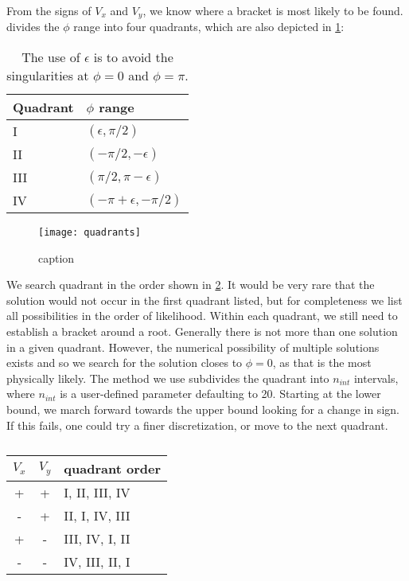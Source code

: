 From the signs of $V_x$ and $V_y$, we know where a bracket is most likely to be found.   divides the $\phi$ range into four quadrants, which are also depicted in \cref{fig:quadrants}:
\begin{table}[htb]
\centering
\caption{The use of $\epsilon$ is to avoid the singularities at $\phi = 0$ and $\phi = \pi$.}
\label{tab:quadrants}
\begin{tabular}{@{}ll@{}}
\toprule
Quadrant & $\phi$ range\\
\midrule
I & $(\epsilon, \pi/2)$ \\
II & $(-\pi/2, -\epsilon)$ \\
III & $(\pi/2, \pi-\epsilon)$ \\
IV & $(-\pi+\epsilon, -\pi/2)$ \\
\bottomrule
\end{tabular}
\end{table}
\begin{figure}[htbp]
\centering
\texttt{[image: quadrants]}
\caption{caption}
\label{fig:quadrants}
\end{figure}

We search quadrant in the order shown in \cref{tab:brackets}.  It would be very rare that the solution would not occur in the first quadrant listed, but for completeness we list all possibilities in the order of likelihood.  Within each quadrant, we still need to establish a bracket around a root.  Generally there is not more than one solution in a given quadrant.  However, the numerical possibility of multiple solutions exists and so we search for the solution closes to $\phi = 0$, as that is the most physically likely.  The method we use subdivides the quadrant into $n_{int}$ intervals, where $n_{int}$ is a user-defined parameter defaulting to 20.  Starting at the lower bound, we march forward towards the upper bound looking for a change in sign.  If this fails, one could try a finer discretization, or move to the next quadrant.

\begin{table}[htb]
\centering
\caption{}
\label{tab:brackets}
\begin{tabular}{@{}ccl@{}}
\toprule
$V_x$ & $V_y$ & quadrant order \\
\midrule
+ & + & I, II, III, IV \\
- & + & II, I, IV, III \\
+ & - & III, IV, I, II \\
- & - & IV, III, II, I \\
\bottomrule
\end{tabular}
\end{table}



